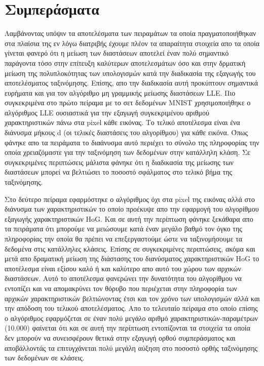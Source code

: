 \chapter{Συμπεράσματα}
\par
Λαμβάνοντας υπόψιν τα αποτελέσματα των πειραμάτων τα οποία πραγματοποιήθηκαν στα πλαίσια της εν λόγω διατριβής έχουμε πλέον τα απαραίτητα στοιχεία απο τα οποία γίνεται φανερό ότι η μείωση των διαστάσεων αποτελεί έναν πολύ σημαντικό παράγοντα τόσο στην επίτευξη καλύτερων αποτελεσμάτων όσο και στην δρματική μείωση της πολυπλοκότητας των υπολογισμών κατά την διαδικασία της εξαγωγής του αποτελέσματος ταξινόμησης. Επίσης, απο την διαδικασία αυτή προκύπτουν σημαντικά ευρήματα και για τον αλγόριθμο μη γραμμικής μείωσης διαστάσεων \textlatin{LLE}. Πιο συγκεκριμένα στο πρώτο πείραμα με το σετ δεδομένων \textlatin{MNIST} χρησιμοποιήθηκε ο αλγόριθμος \textlatin{LLE} ουσιαστικά για την εξαγωγή συγκεκριμένου αριθμού χαρακτηριστικών πάνω στα \textlatin{pixel} κάθε εικόνας. Το τελικό αποτέλεσμα είναι ένα διάνυσμα μήκους \textlatin{d} (οι τελικές διαστάσεις του αλγορίθμου) για κάθε εικόνα. Όπως φάνηκε απο τα πειράματα το διαάνυσμα αυτό περιέχει το σύνολο της πληροφορίας την οποία χρειαζόμαστε για την ταξινόμηση των δεδομένων στην κατάλληλη κλάση. Σε συγκεκριμένες περιπτώσεις μάλιστα φάνηκε ότι η διαδικασία της μείωσης των διαστάσεων μπορεί να βελτιώσει το ποσοστό σφάλματος στο τελικό βήμα της ταξινόμησης. 
\par
Στο δεύτερο πείραμα εφαρμόστηκε ο αλγόριθμος όχι στα \textlatin{pixel} της εικόνας αλλά στο διάνυσμα των χαρακτηριστικών το οποίο προέκυψε απο την εφαρμογή του αλγορίθμου εξαγωγής χαρακτηριστικών \textlatin{HoG}. Και σε αυτή την περίπτωση φάνηκε ξεκάθαρα απο τα πειράματα ότι μπορούμε να μειώσουμε κατά έναν μεγάλο βαθμό τον όγκο της πληροφορίας την οποία θα πρέπει να επεξεργαστούμε ώστε να ταξινομήσουμε τα δεδομένα στις κατάλληλες κλάσεις. Επίσης σε συγκεκριμένες περιπτώσεις, ακόμα και μετά απο δραματική μείωση της διάστασης του διανύσματος χαρακτηριστικών \textlatin{HoG} το αποτέλεσμα είναι εξίσου καλό ή και καλύτερο απο αυτό του χώρου των αρχικών διαστάσεων. Αυτό το αποτέλεσμα φανερώνει την δυνατότητα του αλγορίθμου να εντοπίζει και να απομακρύνει τον θόρυβο που περιέχεται στην πληροφορία των αρχικών χαρακτηριστικών βελτιώνοντας έτσι και τον χρόνο των υπολογισμών αλλά και την απόδοση του τελικού αποτελέσματος. Απο το τελευταίο πείραμα στο οποίο επίσης ο αλγόριθμος εφαρμόζεται σε έναν πολύ μεγάλο αριθμό χαρακτηριστικών-παραμέτρων (10.000) φαίνεται ότι και σε αυτή την περίπτωση εντοπίζονται τα στοιχεία τα οποία δεν μπορούν να συνεισφέρουν θετικά στην εξαγωγή ορθού συμπεράσματος και αποβάλλοντάς τα επιτυγχάνεται πολύ μεγάλη αύξηση στο ποσοστό ορθής ταξινόμησης των δεδομένων σε κλάσεις.
